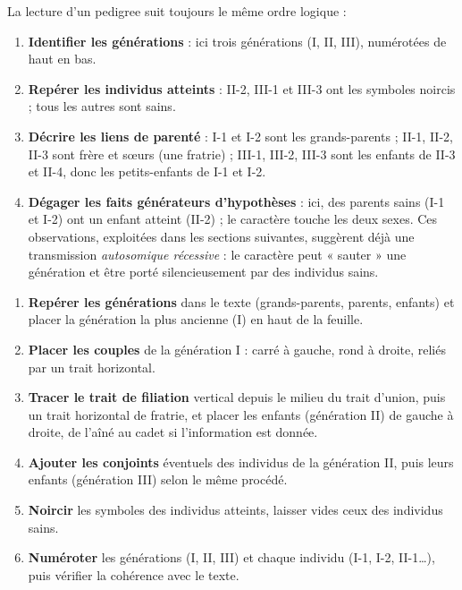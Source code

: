 \documentclass[11pt]{article}
\begin{document}
La lecture d'un pedigree suit toujours le même ordre logique :

\begin{enumerate}
\item \textbf{Identifier les générations} : ici trois générations (I, II, III), numérotées de haut en bas.
\item \textbf{Repérer les individus atteints} : II-2, III-1 et III-3 ont les symboles noircis ; tous les autres sont sains.
\item \textbf{Décrire les liens de parenté} : I-1 et I-2 sont les grands-parents ; II-1, II-2, II-3 sont frère et sœurs (une fratrie) ; III-1, III-2, III-3 sont les enfants de II-3 et II-4, donc les petits-enfants de I-1 et I-2.
\item \textbf{Dégager les faits générateurs d'hypothèses} : ici, des parents sains (I-1 et I-2) ont un enfant atteint (II-2) ; le caractère touche les deux sexes. Ces observations, exploitées dans les sections suivantes, suggèrent déjà une transmission \emph{autosomique récessive} : le caractère peut « sauter » une génération et être porté silencieusement par des individus sains.
\end{enumerate}

\begin{methode}
\begin{enumerate}
\item \textbf{Repérer les générations} dans le texte (grands-parents, parents, enfants) et placer la génération la plus ancienne (I) en haut de la feuille.
\item \textbf{Placer les couples} de la génération I : carré à gauche, rond à droite, reliés par un trait horizontal.
\item \textbf{Tracer le trait de filiation} vertical depuis le milieu du trait d'union, puis un trait horizontal de fratrie, et placer les enfants (génération II) de gauche à droite, de l'aîné au cadet si l'information est donnée.
\item \textbf{Ajouter les conjoints} éventuels des individus de la génération II, puis leurs enfants (génération III) selon le même procédé.
\item \textbf{Noircir} les symboles des individus atteints, laisser vides ceux des individus sains.
\item \textbf{Numéroter} les générations (I, II, III) et chaque individu (I-1, I-2, II-1\ldots), puis vérifier la cohérence avec le texte.
\end{enumerate}
\end{methode}
\end{document}
